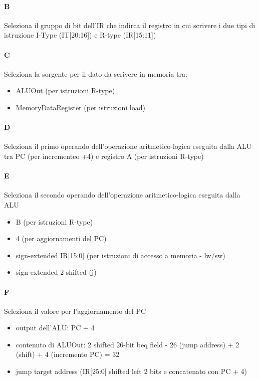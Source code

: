 \documentclass[12pt, a4paper, openany]{book}
\begin{document}
\paragraph*{B} Seleziona il gruppo di bit dell'IR che indirca il registro in cui scrivere
i due tipi di istruzione I-Type (IT[20:16]) e R-type (IR[15:11])
\paragraph*{C}Seleziona la sorgente per il dato da scrivere in memoria tra:
\begin{itemize}
    \item ALUOut (per istruzioni R-type)
    \item MemoryDataRegister (per istruzioni load)
\end{itemize}
\paragraph*{D} Seleziona il primo operando dell'operazione aritmetico-logica eseguita
dalla ALU tra PC (per incrementeo +4) e registro A (per istruzioni R-type)
\paragraph*{E} Seleziona il secondo operando dell'operazione aritmetico-logica eseguita
dalla ALU
\begin{itemize}
    \item B (per istruzioni R-type)
    \item 4 (per aggiornamenti del PC)
    \item sign-extended IR[15:0] (per istruzioni di accesso a memoria - lw/sw)
    \item sign-extended 2-shifted (j)
\end{itemize}
\paragraph*{F} Seleziona il valore per l'aggiornamento del PC
\begin{itemize}
    \item output dell'ALU: PC + 4
    \item contenuto di ALUOut: 2 shifted 26-bit beq field - 26 (jump address) + 2 (shift) + 4 (incremento PC) = 32
    \item jump target address (IR[25:0] shifted left 2 bits e concatenato con PC + 4)
\end{itemize}
\end{document}
